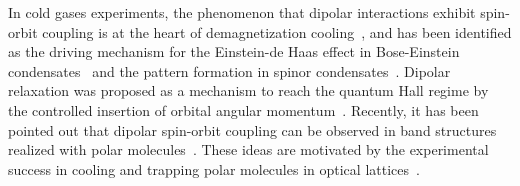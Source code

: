 In cold gases experiments, the phenomenon that dipolar interactions exhibit spin-orbit coupling is at the heart of demagnetization cooling~\cite{Hensler2003,Fattori2006,Pasquiou2011,DePaz2013a},
and has been identified as the driving mechanism for the Einstein-de Haas effect in Bose-Einstein condensates~\cite{Kawaguchi2006} and the pattern formation in spinor condensates~\cite{Santos2006,Vengalattore2008,Kurn2013}.
Dipolar relaxation was proposed as a mechanism to reach the quantum Hall regime by the controlled insertion of orbital angular momentum~\cite{Peter2013}.
Recently, it has been pointed out that dipolar spin-orbit coupling can be observed in band structures realized with polar molecules~\cite{Syzranov2014}.
These ideas are motivated by the experimental success in cooling and trapping polar molecules in optical lattices~\cite{Ni2008b,Yan2013}.




